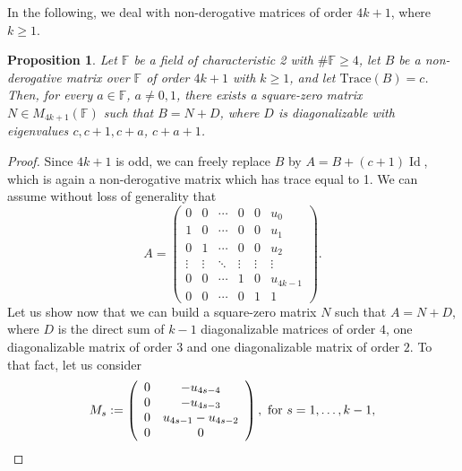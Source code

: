 \documentclass{amsart}
\DeclareMathOperator{\Id}{Id}
\def\FF{\mathbb{F}}
\newtheorem{proposition}[theorem]{Proposition}
\theoremstyle{definition}
\theoremstyle{remark}
\numberwithin{equation}{section}
\begin{document}
In the following, we deal with non-derogative matrices of order $4k+1$, where $k\ge 1$.

\begin{proposition}\label{4k+1}
Let $\FF$ be a field of characteristic 2 with $\#\FF\ge4$, let $B$ be a non-derogative matrix over $\FF$ of order $4k+1$ with $k\ge 1$, and let $\text{Trace}(B)=c$. Then, for every $a\in \FF$, $a\ne 0,1$, there exists a square-zero matrix $N\in {M}_{4k+1}(\FF)$ such that $B=N+D$, where $D$ is diagonalizable with eigenvalues $c,c+1,c+a$, $c+a+1$.
\end{proposition}

\begin{proof} Since $4k+1$ is odd, we can freely replace $B$ by $A=B+(c+1)\Id$, which is again a non-derogative matrix which has trace equal to 1. We can assume without loss of generality that
$$A=\left(\begin{array}{cccccc}
                                                                          0 & 0 & \cdots & 0 & 0 &u_0\\
                                                                          1 & 0 & \cdots & 0 & 0 &u_1\\
                                                                          0 & 1 & \cdots & 0 & 0 &u_2\\
                                                                          \vdots & \vdots & \ddots & \vdots & \vdots &\vdots\\
                                                                          0 & 0 & \cdots & 1 & 0 &u_{4k-1}\\
                                                                          0 & 0 & \cdots & 0 & 1 &1
                                                                        \end{array}\right).$$
Let us show now that we can build a square-zero matrix $N$ such that $A=N+D$, where $D$ is the direct sum of $k-1$ diagonalizable matrices of order $4$, one diagonalizable matrix of order $3$ and one diagonalizable matrix of order $2$. To that fact, let us consider
$$M_s:=\left(
   \begin{array}{cc}
      0 &-u_{4s-4}\\
      0 &-u_{4s-3}\\
      0 &u_{4s-1}-u_{4s-2}\\
      0 &0\\
   \end{array}
 \right),\hbox{ for $s=1,\dots, k-1$,}$$

\end{proof}
\end{document}
